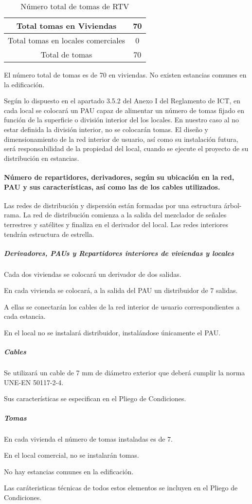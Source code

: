 \begin{table}[H]
\caption{Número total de tomas de RTV}
\label{tomasRTVtotal}
\begin{center}
\begin{tabular}{|c|c|}
\hline
    Total tomas en Viviendas & 70\\
\hline 
    Total tomas en locales comerciales & 0\\
\hline
    Total de tomas & 70	\\
\hline
\end{tabular}
\end{center}
\end{table}

El número total de tomas es de 70 en viviendas. No existen estancias comunes en la edificación.

Según lo dispuesto en el apartado 3.5.2 del Anexo I del Reglamento de ICT, en cada local se colocará un PAU capaz de alimentar un número de tomas fijado en función de la superficie o división interior del los locales. En nuestro caso al no estar definida la división interior, no se colocarán tomas. El diseño y dimensionamiento de la red interior de usuario, así como su instalación futura, será responsabilidad de la propiedad del local, cuando se ejecute el proyecto de su distribución en estancias.

\paragraph{Número de repartidores, derivadores, según su ubicación en la red, PAU y sus características, así como las de los cables utilizados.}

Las redes de distribución y dispersión están formadas por una estructura árbol-rama.
La red de distribución comienza a la salida del mezclador de señales terrestres y satélites y finaliza en el derivador del local.
Las redes interiores tendrán estructura de estrella.


\subparagraph*{Derivadores, PAUs y Repartidores interiores de viviendas y locales}

Cada dos viviendas se colocará un derivador de dos salidas.

En cada vivienda se colocará, a la salida del PAU un distribuidor de 7 salidas. 

A ellas se conectarán los cables de la red interior de usuario correspondientes a cada estancia.

En el local no se instalará distribuidor, instalándose únicamente el PAU.

\subparagraph*{Cables}

Se utilizará un cable de 7 mm de diámetro exterior que deberá cumplir la norma UNE-EN 50117-2-4.

Sus características se especifican en el Pliego de Condiciones.

\subparagraph*{Tomas}

En cada vivienda el número de tomas instaladas es de 7.

En el local comercial, no se instalarán tomas.

No hay estancias comunes en la edificación.

Las caráteristicas técnicas de todos estos elementos se incluyen en el Pliego de Condiciones.